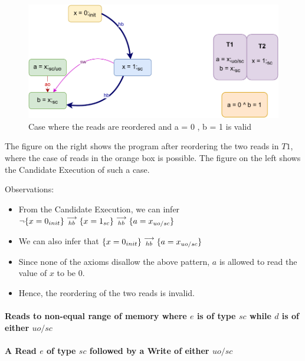         \begin{figure}[H]
            \centering
            \includegraphics[scale=0.7]{InstructionReordering/Example1R(Rsc-Ruo,sc).pdf}
            \caption{Case where the reads are reordered and a = 0 , b = 1 is valid}
        \end{figure}

        The figure on the right shows the program after reordering the two reads in $T1$, where the case of reads in the orange box is possible. 
        The figure on the left shows the Candidate Execution of such a case. 

        Observations:
        \begin{itemize}
            \item From the Candidate Execution, we can infer $\neg\{x=0_{init}\}\stackrel{\longrightarrow}{_{hb}}\{x=1_{sc}\}\stackrel{\longrightarrow}{_{hb}}\{a=x_{uo/sc}\}$
            \item We can also infer that $\{x=0_{init}\}\stackrel{\longrightarrow}{_{hb}}\{a=x_{uo/sc}\}$    
            \item Since none of the axioms disallow the above pattern, $a$ is allowed to read the value of $x$ to be $0$.
            \item Hence, the reordering of the two reads is invalid. 
        \end{itemize}

    \paragraph{Reads to non-equal range  of memory where $e$ is of type $sc$ while $d$ is of either $uo/sc$}

    \paragraph{A Read $e$ of type $sc$ followed by a Write of either $uo/sc$}
        
